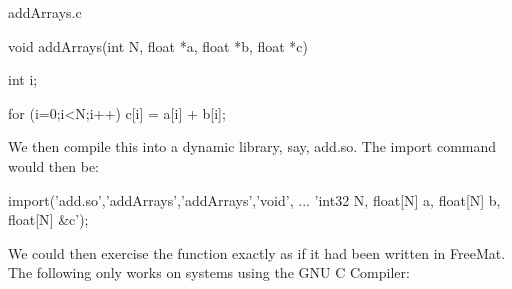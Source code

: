 \begin{DoxyVerb}     addArrays.c
\end{DoxyVerb}



\begin{DoxyVerbInclude}
void addArrays(int N, float *a, float *b, float *c) {
  int i;
 
  for (i=0;i<N;i++)
   c[i] = a[i] + b[i];
}
\end{DoxyVerbInclude}


We then compile this into a dynamic library, say, {\ttfamily add.\-so}. The import command would then be\-: \begin{DoxyVerb}  import('add.so','addArrays','addArrays','void', ...
         'int32 N, float[N] a, float[N] b, float[N] &c');
\end{DoxyVerb}
 We could then exercise the function exactly as if it had been written in Free\-Mat. The following only works on systems using the G\-N\-U C Compiler\-:


